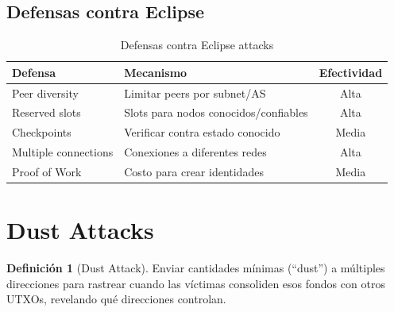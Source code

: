 \documentclass[11pt,a4paper,twoside]{book}
\theoremstyle{definition}
\newtheorem{definition}{Definición}[chapter]
\theoremstyle{remark}
\begin{document}
\subsection{Defensas contra Eclipse}

\begin{table}[htbp]
\centering
\small
\begin{tabular}{lp{5cm}c}
\toprule
\textbf{Defensa} & \textbf{Mecanismo} & \textbf{Efectividad} \\
\midrule
Peer diversity & Limitar peers por subnet/AS & Alta \\
Reserved slots & Slots para nodos conocidos/confiables & Alta \\
Checkpoints & Verificar contra estado conocido & Media \\
Multiple connections & Conexiones a diferentes redes & Alta \\
Proof of Work & Costo para crear identidades & Media \\
\bottomrule
\end{tabular}
\caption{Defensas contra Eclipse attacks}
\end{table}
\section{Dust Attacks}
\label{sec:dust-attacks}

\begin{definition}[Dust Attack]
Enviar cantidades mínimas (``dust'') a múltiples direcciones para rastrear cuando las víctimas consoliden esos fondos con otros UTXOs, revelando qué direcciones controlan.
\end{definition}
\end{document}

